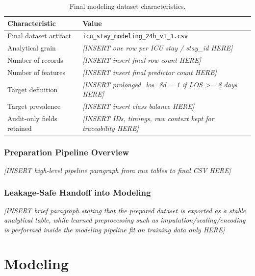 \documentclass[12pt]{article}
\newcommand{\placeholder}[1]{\textit{[INSERT #1 HERE]}}
\begin{document}
\begin{table}[H]
\centering
\small
\caption{Final modeling dataset characteristics.}
\label{tab:final_dataset_characteristics}
\begin{tabular}{@{}L{5.3cm}L{7.0cm}@{}}
\toprule
\textbf{Characteristic} & \textbf{Value} \\
\midrule
Final dataset artifact & \texttt{icu\_stay\_modeling\_24h\_v1\_1.csv} \\
Analytical grain & \placeholder{one row per ICU stay / stay\_id} \\
Number of records & \placeholder{insert final row count} \\
Number of features & \placeholder{insert final predictor count} \\
Target definition & \placeholder{prolonged\_los\_8d = 1 if LOS >= 8 days} \\
Target prevalence & \placeholder{insert class balance} \\
Audit-only fields retained & \placeholder{IDs, timings, raw context kept for traceability} \\
\bottomrule
\end{tabular}
\end{table}

\subsubsection*{Preparation Pipeline Overview}
\placeholder{high-level pipeline paragraph from raw tables to final CSV}

\subsubsection*{Leakage-Safe Handoff into Modeling}
\placeholder{brief paragraph stating that the prepared dataset is exported as a stable analytical table, while learned preprocessing such as imputation/scaling/encoding is performed inside the modeling pipeline fit on training data only}

\newpage

\section{Modeling}
\label{sec:modeling}

%
\end{document}
